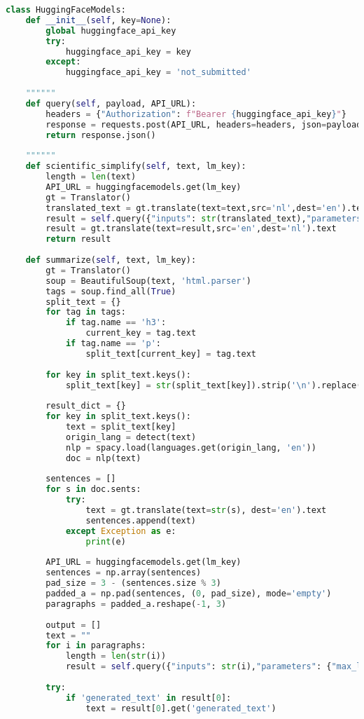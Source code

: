 \begin{lstlisting}[language=Python, caption={HuggingFace-klasse}, label={code:huggingface-klasse}]
class HuggingFaceModels:
	def __init__(self, key=None):
		global huggingface_api_key
		try:
			huggingface_api_key = key
		except:
			huggingface_api_key = 'not_submitted'
	
	""""""
	def query(self, payload, API_URL):
		headers = {"Authorization": f"Bearer {huggingface_api_key}"}
		response = requests.post(API_URL, headers=headers, json=payload)
		return response.json()
	
	""""""
	def scientific_simplify(self, text, lm_key):
		length = len(text)
		API_URL = huggingfacemodels.get(lm_key)
		gt = Translator()
		translated_text = gt.translate(text=text,src='nl',dest='en').text
		result = self.query({"inputs": str(translated_text),"parameters": {"max_length": length},"options":{"wait_for_model":True}}, API_URL)[0]['generated_text']
		result = gt.translate(text=result,src='en',dest='nl').text
		return result
	
	def summarize(self, text, lm_key):
		gt = Translator()        
		soup = BeautifulSoup(text, 'html.parser')
		tags = soup.find_all(True)
		split_text = {}
		for tag in tags:
			if tag.name == 'h3':
				current_key = tag.text
			if tag.name == 'p':
				split_text[current_key] = tag.text
	
		for key in split_text.keys():
			split_text[key] = str(split_text[key]).strip('\n').replace('\n', ' ').replace('\\','')
	
		result_dict = {}
		for key in split_text.keys():
			text = split_text[key]
			origin_lang = detect(text)
			nlp = spacy.load(languages.get(origin_lang, 'en'))
			doc = nlp(text)
	
		sentences = []
		for s in doc.sents:
			try:
				text = gt.translate(text=str(s), dest='en').text
				sentences.append(text)
			except Exception as e:
				print(e)
	
		API_URL = huggingfacemodels.get(lm_key)
		sentences = np.array(sentences)
		pad_size = 3 - (sentences.size % 3)
		padded_a = np.pad(sentences, (0, pad_size), mode='empty')
		paragraphs = padded_a.reshape(-1, 3)
	
		output = []
		text = ""
		for i in paragraphs:
			length = len(str(i))
			result = self.query({"inputs": str(i),"parameters": {"max_length": length},"options":{"wait_for_model":True}}, API_URL)
	
		try:
			if 'generated_text' in result[0]:
				text = result[0].get('generated_text')
	

\end{lstlisting}
